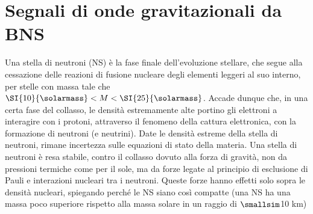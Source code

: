 \chapter[Segnali di GW da BNS]{Segnali di onde gravitazionali da BNS}
\label{chapter:segnaleGWdaBNS}
Una stella di neutroni (NS) è la fase finale dell'evoluzione stellare, che segue alla cessazione delle reazioni di fusione nucleare degli elementi leggeri al suo interno, per stelle con massa tale che	$\SI{10}{\solarmass} < M < \SI{25}{\solarmass}$. Accade dunque che, in una certa fase del collasso, le densità estremamente alte portino gli elettroni a interagire con i protoni, attraverso il fenomeno della cattura elettronica, con la formazione di neutroni (e neutrini). Date le densità estreme della stella di neutroni, rimane incertezza sulle equazioni di stato della materia\cite{hobson2006general}.
Una stella di neutroni è resa stabile, contro il collasso dovuto alla forza di gravità, non da pressioni termiche come per il sole, ma da forze legate al principio di esclusione di Pauli e interazioni nucleari tra i neutroni. Queste forze hanno effetti solo sopra le densità nucleari, spiegando perché le NS siano così compatte (una NS ha una massa poco superiore rispetto alla massa solare in un raggio di $\smallsim$10 km)\cite{hartle2003gravity}

